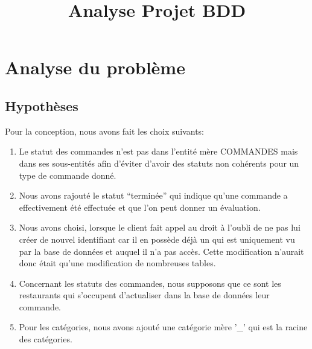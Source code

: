 \documentclass[10pt, a4paper]{article}
\title{Analyse Projet BDD}
\date{}
\begin{document}
\maketitle
\tableofcontents
\newpage

\section{Analyse du problème}
\subsection{Hypothèses}
Pour la conception, nous avons fait les choix suivants:
\begin{enumerate}
    \item Le statut des commandes n'est pas dans l'entité mère COMMANDES
          mais dans ses sous-entités afin d'éviter d'avoir des statuts non cohérents
          pour un type de commande donné.
    \item Nous avons rajouté le statut ``terminée'' qui indique qu'une
          commande a effectivement été effectuée et que l'on peut donner un
          évaluation.
    \item Nous avons choisi, lorsque le client fait appel au droit à l'oubli de ne pas lui créer de nouvel identifiant car il en possède déjà
          un qui est uniquement vu par la base de données et auquel il n'a pas accès. Cette modification n'aurait donc était qu'une modification de nombreuses tables.
    \item Concernant les statuts des commandes, nous supposons que ce sont les restaurants qui s'occupent d'actualiser dans la base de données leur commande.
    \item Pour les catégories, nous avons ajouté une catégorie mère '\_' qui est la racine des catégories.
\end{enumerate}
\end{document}
